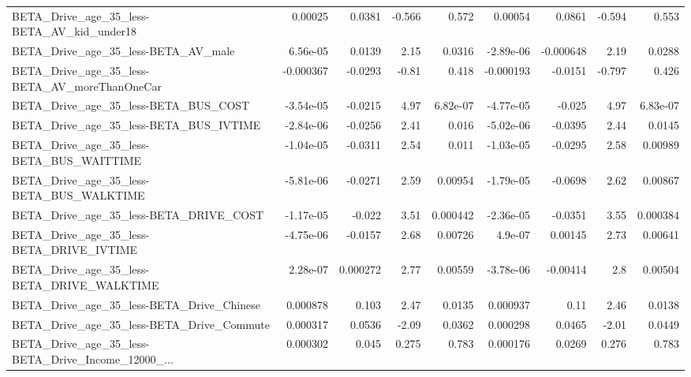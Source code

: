 \begin{tabular}{lrrrrrrrr}
BETA\_Drive\_age\_35\_less-BETA\_AV\_kid\_under18         &     0.00025 &       0.0381 &    -0.566 &    0.572 &    0.00054 &      0.0861 &       -0.594 &         0.553 \\
BETA\_Drive\_age\_35\_less-BETA\_AV\_male                &    6.56e-05 &       0.0139 &      2.15 &   0.0316 &  -2.89e-06 &   -0.000648 &         2.19 &        0.0288 \\
BETA\_Drive\_age\_35\_less-BETA\_AV\_moreThanOneCar      &   -0.000367 &      -0.0293 &     -0.81 &    0.418 &  -0.000193 &     -0.0151 &       -0.797 &         0.426 \\
BETA\_Drive\_age\_35\_less-BETA\_BUS\_COST               &   -3.54e-05 &      -0.0215 &      4.97 & 6.82e-07 &  -4.77e-05 &      -0.025 &         4.97 &      6.83e-07 \\
BETA\_Drive\_age\_35\_less-BETA\_BUS\_IVTIME             &   -2.84e-06 &      -0.0256 &      2.41 &    0.016 &  -5.02e-06 &     -0.0395 &         2.44 &        0.0145 \\
BETA\_Drive\_age\_35\_less-BETA\_BUS\_WAITTIME           &   -1.04e-05 &      -0.0311 &      2.54 &    0.011 &  -1.03e-05 &     -0.0295 &         2.58 &       0.00989 \\
BETA\_Drive\_age\_35\_less-BETA\_BUS\_WALKTIME           &   -5.81e-06 &      -0.0271 &      2.59 &  0.00954 &  -1.79e-05 &     -0.0698 &         2.62 &       0.00867 \\
BETA\_Drive\_age\_35\_less-BETA\_DRIVE\_COST             &   -1.17e-05 &       -0.022 &      3.51 & 0.000442 &  -2.36e-05 &     -0.0351 &         3.55 &      0.000384 \\
BETA\_Drive\_age\_35\_less-BETA\_DRIVE\_IVTIME           &   -4.75e-06 &      -0.0157 &      2.68 &  0.00726 &    4.9e-07 &     0.00145 &         2.73 &       0.00641 \\
BETA\_Drive\_age\_35\_less-BETA\_DRIVE\_WALKTIME         &    2.28e-07 &     0.000272 &      2.77 &  0.00559 &  -3.78e-06 &    -0.00414 &          2.8 &       0.00504 \\
BETA\_Drive\_age\_35\_less-BETA\_Drive\_Chinese          &    0.000878 &        0.103 &      2.47 &   0.0135 &   0.000937 &        0.11 &         2.46 &        0.0138 \\
BETA\_Drive\_age\_35\_less-BETA\_Drive\_Commute          &    0.000317 &       0.0536 &     -2.09 &   0.0362 &   0.000298 &      0.0465 &        -2.01 &        0.0449 \\
BETA\_Drive\_age\_35\_less-BETA\_Drive\_Income\_12000\_... &    0.000302 &        0.045 &     0.275 &    0.783 &   0.000176 &      0.0269 &        0.276 &         0.783 \\

\end{tabular}
